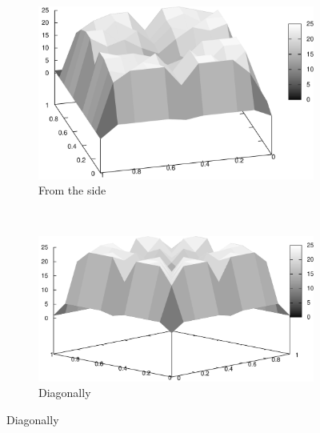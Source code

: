 \documentclass{article}
\begin{document}
	\begin{figure}
		\centering
		\begin{subfigure}[b]{0.45\textwidth}
			\centering
			\includegraphics[width=\textwidth]{images/r3_side}
			\caption{From the side}
			\label{fig:r3_side}
		\end{subfigure}
		~
		\begin{subfigure}[b]{0.45\textwidth}
			\centering
			\includegraphics[width=\textwidth]{images/r3_diagonal}
			\caption{Diagonally}
			\label{fig:r3_diagonal}
		\end{subfigure}


\end{figure}
\end{document}
